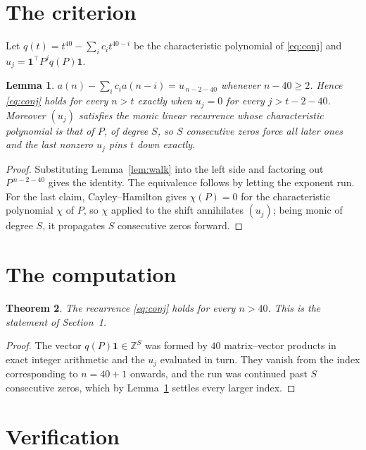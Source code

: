 \documentclass[11pt,a4paper]{article}
\theoremstyle{plain}
\newtheorem{theorem}{Theorem}
\newtheorem{lemma}[theorem]{Lemma}
\theoremstyle{definition}
\begin{document}
\section{The criterion}

Let $q(t)=t^{40}-\sum_i c_i t^{40-i}$ be the characteristic polynomial of
\eqref{eq:conj} and $u_j=\mathbf{1}^{\!\top}P^{j}q(P)\mathbf{1}$.

\begin{lemma}\label{lem:crit}
$a(n)-\sum_i c_i a(n-i)=u_{\,n-2-40}$ whenever $n-40\ge2$. Hence
\eqref{eq:conj} holds for every $n>t$ exactly when $u_j=0$ for every
$j>t-2-40$. Moreover $(u_j)$ satisfies the monic linear recurrence whose
characteristic polynomial is that of $P$, of degree $S$, so $S$ consecutive zeros force all
later ones and the last nonzero $u_j$ pins $t$ down exactly.
\end{lemma}

\begin{proof}
Substituting Lemma~\ref{lem:walk} into the left side and factoring out
$P^{\,n-2-40}$ gives the identity. The equivalence follows by letting the exponent
run. For the last claim, Cayley--Hamilton gives $\chi(P)=0$ for the characteristic
polynomial $\chi$ of $P$, so $\chi$ applied to the shift annihilates $(u_j)$; being monic of
degree $S$, it propagates $S$ consecutive zeros forward.
\end{proof}

\section{The computation}

\begin{theorem}
The recurrence \eqref{eq:conj} holds for every $n>40$. This is the statement of
Section~1.
\end{theorem}

\begin{proof}
The vector $q(P)\mathbf{1}\in\mathbb{Z}^{S}$ was formed by $40$ matrix--vector
products in exact integer arithmetic and the $u_j$ evaluated in turn. They vanish from the
index corresponding to $n=40+1$ onwards, and the run was continued past $S$ consecutive
zeros, which by Lemma~\ref{lem:crit} settles every larger index.
\end{proof}

\section{Verification}
\end{document}
